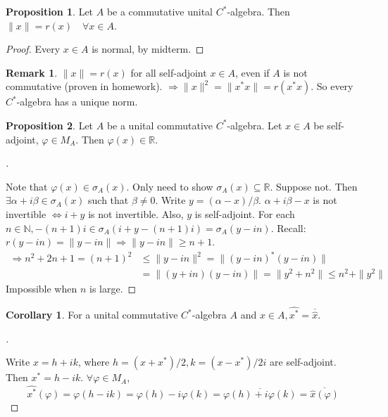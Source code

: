 \documentclass{article}
\theoremstyle{definition}
\newtheorem{rem}{Remark}
\newtheorem{cor}{Corollary}
\newtheorem{prop}{Proposition}
\newenvironment{proofs}[1][\proofname]{%
  \begin{proof}[#1]$ $\par\nobreak\ignorespaces
}{%
  \end{proof}
}
\newcommand{\NN}{\mathbb N}
\newcommand{\RR}{\mathbb R}
\newcommand{\Ra}{\Rightarrow}
\newcommand{\Lra}{\Leftrightarrow}
\begin{document}
\begin{prop}
	Let $A$ be a commutative unital $C^*$-algebra.
	Then $\|x\| = r(x) \quad \forall x \in A$.
\end{prop}

\begin{proof}
	Every $x \in A$ is normal, by midterm.
\end{proof}

\begin{rem}
	$\|x\| = r(x)$ for all self-adjoint $x \in A$, even if $A$ is not commutative (proven in homework).
	$\Ra \|x\|^2 = \|x^* x\| = r(x^* x)$.
	So every $C^*$-algebra has a unique norm.
\end{rem}

\begin{prop}
	Let $A$ be a unital commutative $C^*$-algebra.
	Let $x \in A$ be self-adjoint, $\varphi \in M_A$.
	Then $\varphi(x) \in \RR$.
\end{prop}

\begin{proofs}
	Note that $\varphi(x) \in \sigma_A(x)$.
	Only need to show $\sigma_A(x) \subseteq \RR$.
	Suppose not.
	Then $\exists \alpha + i \beta \in \sigma_A(x)$ such that $\beta \neq 0$.
	Write $y = (\alpha - x)/\beta$.
	$\alpha + i \beta - x$ is not invertible $\Lra i + y$ is not invertible.
	Also, $y$ is self-adjoint.
	For each $n \in \NN, -(n + 1)i \in \sigma_A(i + y - (n + 1)i) = \sigma_A(y - in)$.
	Recall: $r(y - in) = \|y - in\| \Ra \|y - in\| \geq n + 1$.
	\[
		\begin{split}
			\Ra n^2 + 2n + 1 = (n + 1)^2 &\leq \|y - in\|^2 = \|(y - in)^* (y - in)\|\\
			&= \|(y + in) (y - in)\| = \|y^2 + n^2 \| \leq n^2 + \|y^2\|
		\end{split}
	\]
	Impossible when $n$ is large.
\end{proofs}

\begin{cor}
	For a unital commutative $C^*$-algebra $A$ and $x \in A, \widehat{x^*} = \overline{\widehat{x}}$.
\end{cor}

\begin{proofs}
	Write $x = h + ik$, where $h = (x + x^*)/2, k = (x - x^*)/2 i$ are self-adjoint.
	Then $x^* = h - ik$.
	$\forall \varphi \in M_A$, 
	\[
		\widehat{x^*}(\varphi) = \varphi(h - ik) = \varphi(h) - i \varphi(k) = \overline{\varphi(h) + i \varphi(k)} = \overline{\widehat{x}(\varphi)}
	\]
\end{proofs}
\end{document}
